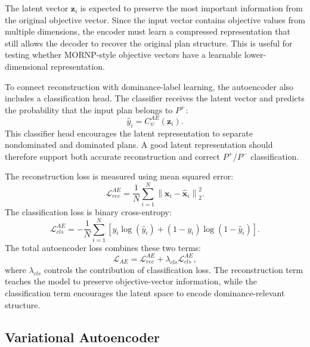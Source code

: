 The latent vector $\mathbf{z}_i$ is expected to preserve the most important information from the original objective vector. Since the input vector contains objective values from multiple dimensions, the encoder must learn a compressed representation that still allows the decoder to recover the original plan structure. This is useful for testing whether MORNP-style objective vectors have a learnable lower-dimensional representation.

To connect reconstruction with dominance-label learning, the autoencoder also includes a classification head. The classifier receives the latent vector and predicts the probability that the input plan belongs to $P^{+}$:
\begin{equation}
    \hat{y}_i = C_{\psi}^{AE}(\mathbf{z}_i).
    \label{eq:ae_classifier}
\end{equation}
This classifier head encourages the latent representation to separate nondominated and dominated plans. A good latent representation should therefore support both accurate reconstruction and correct $P^{+}/P^{-}$ classification.

The reconstruction loss is measured using mean squared error:
\begin{equation}
    \mathcal{L}_{rec}^{AE}
    =
    \frac{1}{N}
    \sum_{i=1}^{N}
    \left\|
        \mathbf{x}_i - \hat{\mathbf{x}}_i
    \right\|_2^2.
    \label{eq:ae_reconstruction_loss}
\end{equation}
The classification loss is binary cross-entropy:
\begin{equation}
    \mathcal{L}_{cls}^{AE}
    =
    -\frac{1}{N}
    \sum_{i=1}^{N}
    \left[
        y_i \log(\hat{y}_i)
        +
        (1-y_i)\log(1-\hat{y}_i)
    \right].
    \label{eq:ae_classification_loss}
\end{equation}
The total autoencoder loss combines these two terms:
\begin{equation}
    \mathcal{L}_{AE}
    =
    \mathcal{L}_{rec}^{AE}
    +
    \lambda_{cls}\mathcal{L}_{cls}^{AE},
    \label{eq:ae_total_loss}
\end{equation}
where $\lambda_{cls}$ controls the contribution of classification loss. The reconstruction term teaches the model to preserve objective-vector information, while the classification term encourages the latent space to encode dominance-relevant structure.

\subsection{Variational Autoencoder}
\label{subsec:vae}

